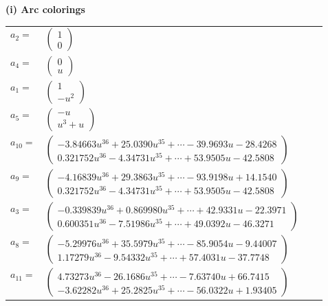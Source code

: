 \documentclass[1p]{elsarticle_modified}
\theoremstyle{definition}
\begin{document}
\flushleft \textbf{(i) Arc colorings}\\
\begin{tabular}{m{7pt} m{180pt} m{7pt} m{180pt} }
\flushright $a_{2}=$&$\begin{pmatrix}1\\0\end{pmatrix}$ \\
\flushright $a_{4}=$&$\begin{pmatrix}0\\u\end{pmatrix}$ \\
\flushright $a_{1}=$&$\begin{pmatrix}1\\- u^2\end{pmatrix}$ \\
\flushright $a_{5}=$&$\begin{pmatrix}- u\\u^3+u\end{pmatrix}$ \\
\flushright $a_{10}=$&$\begin{pmatrix}-3.84663 u^{36}+25.0390 u^{35}+\cdots-39.9693 u-28.4268\\0.321752 u^{36}-4.34731 u^{35}+\cdots+53.9505 u-42.5808\end{pmatrix}$ \\
\flushright $a_{9}=$&$\begin{pmatrix}-4.16839 u^{36}+29.3863 u^{35}+\cdots-93.9198 u+14.1540\\0.321752 u^{36}-4.34731 u^{35}+\cdots+53.9505 u-42.5808\end{pmatrix}$ \\
\flushright $a_{3}=$&$\begin{pmatrix}-0.339839 u^{36}+0.869980 u^{35}+\cdots+42.9331 u-22.3971\\0.600351 u^{36}-7.51986 u^{35}+\cdots+49.0392 u-46.3271\end{pmatrix}$ \\
\flushright $a_{8}=$&$\begin{pmatrix}-5.29976 u^{36}+35.5979 u^{35}+\cdots-85.9054 u-9.44007\\1.17279 u^{36}-9.54332 u^{35}+\cdots+57.4031 u-37.7748\end{pmatrix}$ \\
\flushright $a_{11}=$&$\begin{pmatrix}4.73273 u^{36}-26.1686 u^{35}+\cdots-7.63740 u+66.7415\\-3.62282 u^{36}+25.2825 u^{35}+\cdots-56.0322 u+1.93405\end{pmatrix}$ \\

\end{tabular}
\end{document}

